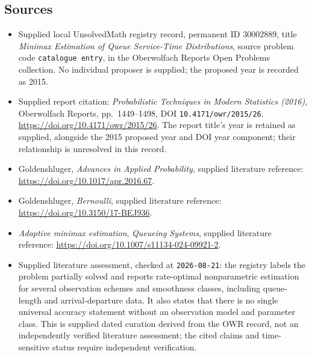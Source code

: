 \documentclass[11pt]{article}
\begin{document}
\subsection{Sources}
\begin{itemize}
\item Supplied local UnsolvedMath registry record, permanent ID \(30002889\), title \emph{Minimax Estimation of Queue Service-Time Distributions}, source problem code \texttt{catalogue entry}, in the Oberwolfach Reports Open Problems collection. No individual proposer is supplied; the proposed year is recorded as 2015.
\item Supplied report citation: \emph{Probabilistic Techniques in Modern Statistics (2016)}, Oberwolfach Reports, pp.~1449--1498, DOI \texttt{10.4171/owr/2015/26}. \url{https://doi.org/10.4171/owr/2015/26}. The report title's year is retained as supplied, alongside the 2015 proposed year and DOI year component; their relationship is unresolved in this record.
\item Goldenshluger, \emph{Advances in Applied Probability}, supplied literature reference: \url{https://doi.org/10.1017/apr.2016.67}.
\item Goldenshluger, \emph{Bernoulli}, supplied literature reference: \url{https://doi.org/10.3150/17-BEJ936}.
\item \emph{Adaptive minimax estimation}, \emph{Queueing Systems}, supplied literature reference: \url{https://doi.org/10.1007/s11134-024-09921-2}.
\item Supplied literature assessment, checked at \texttt{2026-08-21}: the registry labels the problem partially solved and reports rate-optimal nonparametric estimation for several observation schemes and smoothness classes, including queue-length and arrival-departure data. It also states that there is no single universal accuracy statement without an observation model and parameter class. This is supplied dated curation derived from the OWR record, not an independently verified literature assessment; the cited claims and time-sensitive status require independent verification.
\end{itemize}
\end{document}
